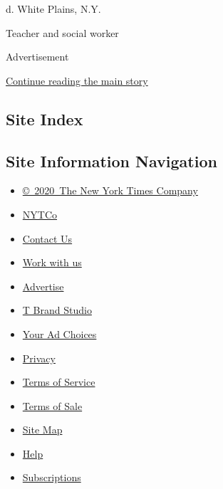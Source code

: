 d. White Plains, N.Y.

Teacher and social worker

Advertisement

\protect\hyperlink{after-bottom}{Continue reading the main story}

\hypertarget{site-index}{%
\subsection{Site Index}\label{site-index}}

\hypertarget{site-information-navigation}{%
\subsection{Site Information
Navigation}\label{site-information-navigation}}

\begin{itemize}
\tightlist
\item
  \href{https://help.nytimes.com/hc/en-us/articles/115014792127-Copyright-notice}{©~2020~The
  New York Times Company}
\end{itemize}

\begin{itemize}
\tightlist
\item
  \href{https://www.nytco.com/}{NYTCo}
\item
  \href{https://help.nytimes.com/hc/en-us/articles/115015385887-Contact-Us}{Contact
  Us}
\item
  \href{https://www.nytco.com/careers/}{Work with us}
\item
  \href{https://nytmediakit.com/}{Advertise}
\item
  \href{http://www.tbrandstudio.com/}{T Brand Studio}
\item
  \href{https://www.nytimes.com/privacy/cookie-policy\#how-do-i-manage-trackers}{Your
  Ad Choices}
\item
  \href{https://www.nytimes.com/privacy}{Privacy}
\item
  \href{https://help.nytimes.com/hc/en-us/articles/115014893428-Terms-of-service}{Terms
  of Service}
\item
  \href{https://help.nytimes.com/hc/en-us/articles/115014893968-Terms-of-sale}{Terms
  of Sale}
\item
  \href{https://spiderbites.nytimes.com}{Site Map}
\item
  \href{https://help.nytimes.com/hc/en-us}{Help}
\item
  \href{https://www.nytimes.com/subscription?campaignId=37WXW}{Subscriptions}
\end{itemize}
